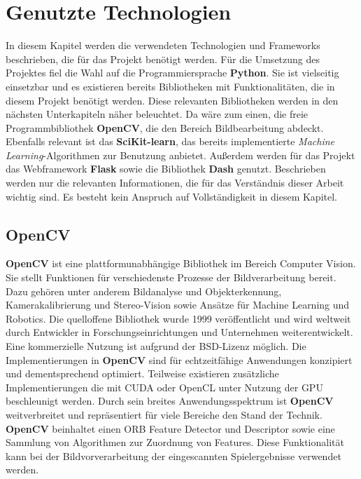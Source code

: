 \section{Genutzte Technologien}
In diesem Kapitel werden die verwendeten Technologien und Frameworks beschrieben, die für das Projekt benötigt werden.
Für die Umsetzung des Projektes fiel die Wahl auf die Programmiersprache \textbf{Python}. Sie ist vielseitig einsetzbar und es existieren bereits Bibliotheken mit
Funktionalitäten, die in diesem Projekt benötigt werden. Diese relevanten Bibliotheken werden in den nächsten Unterkapiteln näher beleuchtet.
Da wäre zum einen, die freie Programmbibliothek \textbf{OpenCV}, die den Bereich Bildbearbeitung abdeckt. Ebenfalls relevant ist das \textbf{SciKit-learn}, das 
bereits implementierte \textit{Machine Learning}-Algorithmen zur Benutzung anbietet. Außerdem werden für das Projekt das Webframework \textbf{Flask} sowie
die Bibliothek \textbf{Dash} genutzt. Beschrieben werden nur die relevanten Informationen, die für das Verständnis dieser Arbeit wichtig sind. 
Es besteht kein Anspruch auf Vollständigkeit in diesem Kapitel.

\subsection{OpenCV}
\textbf{OpenCV} ist eine plattformunabhängige Bibliothek im Bereich Computer Vision. Sie stellt Funktionen für verschiedenste Prozesse der Bildverarbeitung bereit.
Dazu gehören unter anderem Bildanalyse und Objekterkennung, Kamerakalibrierung und Stereo-Vision sowie Ansätze für Machine Learning und Robotics.
Die quelloffene Bibliothek wurde 1999 veröffentlicht und wird weltweit durch Entwickler in Forschungseinrichtungen und Unternehmen weiterentwickelt. 
Eine kommerzielle Nutzung ist aufgrund der BSD-Lizenz möglich. Die Implementierungen in \textbf{OpenCV} sind für echtzeitfähige Anwendungen konzipiert 
und dementsprechend optimiert. 
Teilweise existieren zusätzliche Implementierungen die mit CUDA oder OpenCL unter Nutzung der GPU beschleunigt werden.
Durch sein breites Anwendungsspektrum ist \textbf{OpenCV} weitverbreitet und repräsentiert für viele Bereiche den Stand der Technik. 
\textbf{OpenCV} beinhaltet einen ORB Feature Detector und Descriptor sowie eine Sammlung von Algorithmen zur Zuordnung von Features.
Diese Funktionalität kann bei der Bildvorverarbeitung der eingescannten Spielergebnisse verwendet werden.

